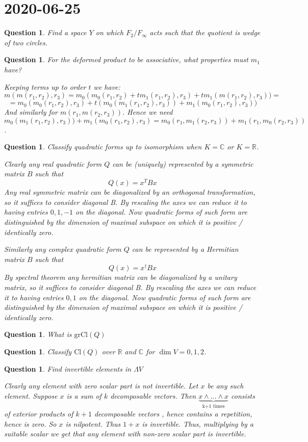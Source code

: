 \documentclass[a4paper]{article}
\newtheorem{que}[thm]{Question}
\begin{document}
\section*{ 2020-06-25}

\begin{que} Find a space $Y$ on which $F_2/F_\infty$ acts such that the quotient is wedge of two circles.

\end{que} 
\begin{que} For the deformed product to be associative, what properties must $m_1$ have?
	
	Keeping terms up to order $t$ we have:
	$$m(m(r_1, r_2), r_3) = m_0(m_0(r_1, r_2) + t m_1(r_1,r_2), r_3) + t m_1(m(r_1, r_2), r_3)) = $$
	$$ = m_0(m_0(r_1, r_2), r_3) + t (m_0(m_1(r_1, r_2), r_3)) +  m_1(m_0(r_1, r_2), r_3))$$
	And similarly for $m(r_1, m(r_2, r_3))$. Hence we need 
	$$m_0(m_1(r_1, r_2), r_3)) +  m_1(m_0(r_1, r_2), r_3) = m_0(r_1, m_1(r_2, r_3)) +  m_1(r_1, m_0(r_2, r_3))$$.
\end{que}
\begin{que} Classify quadratic forms up to isomorphism when $K = \mathbb{C}$ or $K = \mathbb{R}$. 
	
	
	Clearly any real quadratic form $Q$ can be (uniquely) represented by a symmetric matrix $B$ such that
	$$Q(x) = x^T B x$$
	Any real symmetric matrix can be diagonalized by an orthogonal transformation, so it suffices to consider diagonal B. By rescaling the axes we can reduce it to having entries $0, 1, -1$ on the diagonal. Now quadratic forms of such form are distinguished by the dimension of maximal subspace on which it is positive / identically zero.
	
	Similarly any complex quadratic form $Q$ can be represented by a Hermitian matrix $B$ such that 
	$$Q(x) = x^\dag B x$$
	By spectral theorem any hermitian matrix can be diagonalized by a unitary matrix, so it suffices to consider diagonal B.
	By rescaling the axes we can reduce it to having entries $0, 1$ on the diagonal. Now quadratic forms of such form are distinguished by the dimension of maximal subspace on which it is positive / identically zero.
\end{que}
\begin{que} What is $\text{gr}  \text{Cl}(Q)$
\end{que}
\begin{que} Classify $ \text{Cl}(Q)$ over $\mathbb{R}$ and $\mathbb{C}$ for $\dim V = 0, 1, 2$.

\end{que}
\begin{que} Find invertible elements in $\Lambda V$
	
	Clearly any element with zero scalar part is not invertible. Let $x$ be any such element. Suppose $x$ is a sum of $k$ decomposable vectors. Then $\underbrace{x \wedge ... \wedge x}_\text{k+1 times}$ consists of exterior products of $k+1$ decomposable vectors , hence contains a repetition, hence is zero. So $x$ is nilpotent. Thus $1+x$ is invertible. Thus, multiplying by a suitable scalar we get that any element with non-zero scalar part is invertible.
	
\end{que}
\end{document}
